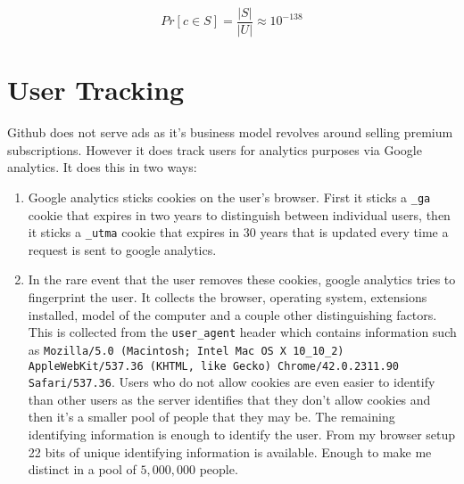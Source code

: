 \documentclass[12pt]{article}
\begin{document}
$$Pr[c \in S] = \frac{|S|}{|U|} \approx 10^{-138}$$


\section{User Tracking}\label{tracking}
Github does not serve ads as it's business model revolves around selling premium subscriptions. However it does track users for analytics purposes via Google analytics. It does this in two ways:

\begin{enumerate}
\item Google analytics sticks cookies on the user's browser. First it sticks a {\tt \_ga} cookie that expires in two years to distinguish between individual users, then it sticks a {\tt \_utma} cookie that expires in 30 years that is updated every time a request is sent to google analytics. %
\item In the rare event that the user removes these cookies, google analytics tries to fingerprint the user. It collects the browser, operating system, extensions installed, model of the computer and a couple other distinguishing factors. This is collected from the {\tt user\_agent} header which contains information such as {\tt Mozilla/5.0 (Macintosh; Intel Mac OS X 10\_10\_2) AppleWebKit/537.36 (KHTML, like Gecko) Chrome/42.0.2311.90 Safari/537.36}. Users who do not allow cookies are even easier to identify than other users as the server identifies that they don't allow cookies and then it's a smaller pool of people that they may be. The remaining identifying information is enough to identify the user. From my browser setup 22 bits of unique identifying information is available. Enough to make me distinct in a pool of $5,000,000$ people.

\begin{figure}




\end{figure}
\end{enumerate}
\end{document}
